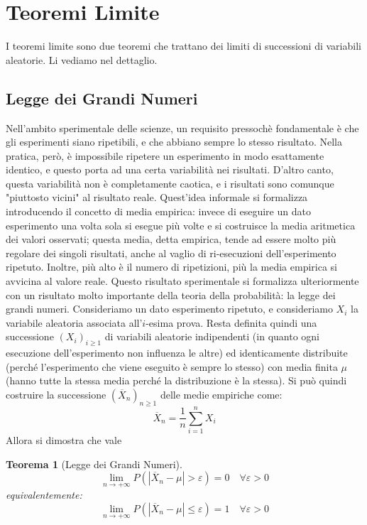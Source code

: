 \documentclass{article}
\theoremstyle{plain}
\newtheorem{teorema}{Teorema}[section]
\theoremstyle{definition}
\theoremstyle{remark}
\begin{document}
\section{Teoremi Limite} %
\label{sec:teoremi_limite}
I teoremi limite sono due teoremi che trattano dei limiti di successioni di variabili aleatorie. Li vediamo nel dettaglio.
\subsection{Legge dei Grandi Numeri} %
\label{sub:legge_dei_grandi_numeri}
Nell'ambito sperimentale delle scienze, un requisito pressochè fondamentale è che gli esperimenti siano ripetibili, e che abbiano sempre lo stesso risultato. Nella pratica, però, è impossibile ripetere un esperimento in modo esattamente identico, e questo porta ad una certa variabilità nei risultati. D'altro canto, questa variabilità non è completamente caotica, e i risultati sono comunque "piuttosto vicini" al risultato reale. Quest'idea informale si formalizza introducendo il concetto di media empirica: invece di eseguire un dato esperimento una volta sola si esegue più volte e si costruisce la media aritmetica dei valori osservati; questa media, detta empirica, tende ad essere molto più regolare dei singoli risultati, anche al vaglio di ri-esecuzioni dell'esperimento ripetuto. Inoltre, più alto è il numero di ripetizioni, più la media empirica si avvicina al valore reale. Questo risultato sperimentale si formalizza ulteriormente con un risultato molto importante della teoria della probabilità: la legge dei grandi numeri. Consideriamo un dato esperimento ripetuto, e consideriamo $X_i$ la variabile aleatoria associata all'$i$-esima prova. Resta definita quindi una successione $(X_i)_{i\geq1}$ di variabili aleatorie indipendenti (in quanto ogni esecuzione dell'esperimento non influenza le altre) ed identicamente distribuite (perché l'esperimento che viene eseguito è sempre lo stesso) con media finita $\mu$ (hanno tutte la stessa media perché la distribuzione è la stessa). Si può quindi costruire la successione $(\overline{X}_n)_{n\geq1}$ delle medie empiriche come:
\begin{equation*}
	\overline{X}_n=\frac{1}{n}\sum_{i=1}^nX_i
\end{equation*}
Allora si dimostra che vale
\begin{teorema}[Legge dei Grandi Numeri]
	\begin{equation*}
		\lim_{n\to+\infty}P(|\overline{X}_n-\mu|>\varepsilon)=0\quad\forall\varepsilon>0
	\end{equation*}
	equivalentemente:
	\begin{equation*}
		\lim_{n\to+\infty}P(|\overline{X}_n-\mu|\leq\varepsilon)=1\quad\forall\varepsilon>0
	\end{equation*}
\end{teorema}
\end{document}
